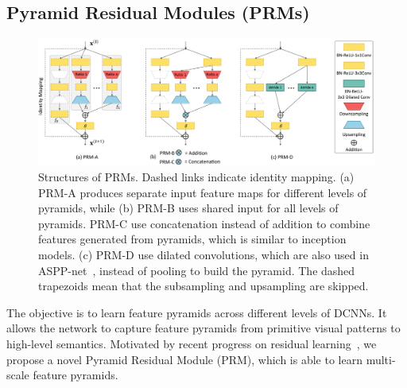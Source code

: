 \documentclass[10pt,twocolumn,letterpaper]{article}
\begin{document}
\subsection{Pyramid Residual Modules (PRMs)}\label{sec:prm}

\begin{figure}[t]
	\begin{center}
		\includegraphics[width=0.92\linewidth]{figures/prm8.pdf}
	\end{center}
	\caption{Structures of PRMs. Dashed links indicate identity mapping. 
		(a) PRM-A produces separate input feature maps for different levels of pyramids, while (b) PRM-B uses shared input for all levels of pyramids. 
		PRM-C use concatenation instead of addition to combine features generated from pyramids, which is similar to inception models. 
		(c) PRM-D use dilated convolutions, which are also used in ASPP-net~\cite{chen2016deeplab}, instead of pooling to build the pyramid. 
		The dashed trapezoids mean that the subsampling and upsampling are skipped. }
	\label{fig:pyramidmodule}
	\vspace{-1em}
\end{figure}


The objective is to learn feature pyramids across different levels of DCNNs. 
It allows the network to capture feature pyramids from primitive visual patterns to high-level semantics. 
Motivated by recent progress on residual learning~\cite{he2016deep,he2016identity}, we propose a novel Pyramid Residual Module (PRM), which is able to learn multi-scale feature pyramids.
\end{document}
